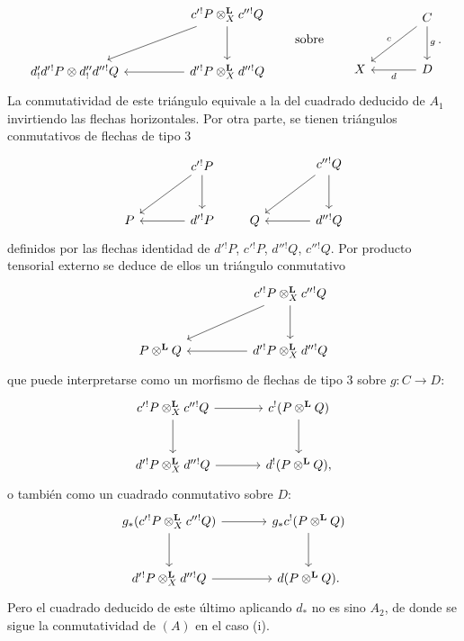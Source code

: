 \begin{prooftext}[Demostración]
\[\begin{tikzcd}[column sep=huge,row sep=large]
& c'{}^!P\otimes_X^{\mathbf L}c''{}^!Q \arrow[d] \arrow[dl]\\
d'_!d'{}^!P\otimes d''_!d''{}^!Q &
d'{}^!P\otimes_X^{\mathbf L}d''{}^!Q\arrow[l]
\end{tikzcd}
\qquad\text{sobre}\qquad
\begin{tikzcd}[column sep=large,row sep=large]
& C\arrow[d,"g"]\arrow[dl,"c"']\\
X & D\arrow[l,"d"]
\end{tikzcd}.
\]
La conmutatividad de este triángulo equivale a la del cuadrado deducido de $A_1$ invirtiendo las flechas horizontales. Por otra parte, se tienen triángulos conmutativos de flechas de tipo $3$
\[
\begin{tikzcd}[column sep=large,row sep=large]
& c'{}^!P \arrow[d]\arrow[dl]\\
P & d'{}^!P\arrow[l]
\end{tikzcd}
\qquad
\begin{tikzcd}[column sep=large,row sep=large]
& c''{}^!Q \arrow[d]\arrow[dl]\\
Q & d''{}^!Q\arrow[l]
\end{tikzcd}
\]
definidos por las flechas identidad de $d'{}^!P$, $c'{}^!P$, $d''{}^!Q$, $c''{}^!Q$. Por producto tensorial externo se deduce de ellos un triángulo conmutativo
\[
\begin{tikzcd}[column sep=huge,row sep=large]
& c'{}^!P\otimes_X^{\mathbf L}c''{}^!Q \arrow[d]\arrow[dl]\\
P\otimes^{\mathbf L}Q & d'{}^!P\otimes_X^{\mathbf L}d''{}^!Q\arrow[l]
\end{tikzcd}
\]
que puede interpretarse como un morfismo de flechas de tipo $3$ sobre $g:C\longrightarrow D$:
\[
\begin{tikzcd}[column sep=large,row sep=large]
c'{}^!P\otimes_X^{\mathbf L}c''{}^!Q \arrow[r]\arrow[d] &
c^!(P\otimes^{\mathbf L}Q)\arrow[d]\\
d'{}^!P\otimes_X^{\mathbf L}d''{}^!Q \arrow[r] &
d^!(P\otimes^{\mathbf L}Q),
\end{tikzcd}
\]
o también como un cuadrado conmutativo sobre $D$:
\[
\begin{tikzcd}[column sep=large,row sep=large]
g_*(c'{}^!P\otimes_X^{\mathbf L}c''{}^!Q) \arrow[r]\arrow[d] &
g_*c^!(P\otimes^{\mathbf L}Q)\arrow[d]\\
d'{}^!P\otimes_X^{\mathbf L}d''{}^!Q \arrow[r] &
d(P\otimes^{\mathbf L}Q).
\end{tikzcd}
\]
Pero el cuadrado deducido de este último aplicando $d_*$ no es sino $A_2$, de donde se sigue la conmutatividad de $(A)$ en el caso (i).


\end{prooftext}
